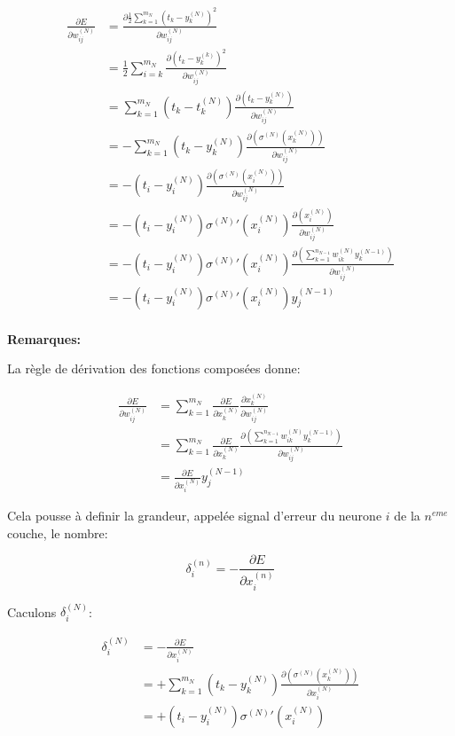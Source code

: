 \documentclass[11pt]{article}
\begin{document}
\begin{align}
\frac{\partial E}{\partial w_{ij}^{(N)}}
& = \frac{\partial \frac{1}{2}\sum_{k=1}^{m_{N}}
(t_{k}-y_{k}^{(N)})^{2}}{\partial w_{ij}^{(N)}}\\
& = \frac{1}{2}\sum_{i=k}^{m_{N}}
\frac{\partial (t_{k}-y_{k}^{(k)})^{2}}{\partial w_{ij}^{(N)}}\\
& = \sum_{k=1}^{m_{N}}(t_{k}-t_{k}^{(N)})
\frac{\partial (t_{k}-y_{k}^{(N)})}{\partial w_{ij}^{(N)}}\\
& = -\sum_{k=1}^{m_{N}}(t_{k}-y_{k}^{(N)})
\frac{\partial (\sigma^{(N)}(x_{k}^{(N)}))}{\partial w_{ij}^{(N)}}\\
& = -(t_{i}-y_{i}^{(N)})
\frac{\partial (\sigma^{(N)}(x_{i}^{(N)}))}{\partial w_{ij}^{(N)}}\\
& = -(t_{i}-y_{i}^{(N)})\sigma^{(N)}'(x_{i}^{(N)})
\frac{\partial (x_{i}^{(N)})}{\partial w_{ij}^{(N)}}\\
& = -(t_{i}-y_{i}^{(N)})\sigma^{(N)}'(x_{i}^{(N)})
\frac{\partial (\sum_{k=1}^{n_{N-1}}w_{ik}^{(N)}y_{k}^{(N-1)})}
{\partial w_{ij}^{(N)}}\\
& = -(t_{i}-y_{i}^{(N)})\sigma^{(N)}'(x_{i}^{(N)})y_{j}^{(N-1)}\\
\end{align}

\textbf{Remarques:}

La règle de dérivation des fonctions composées donne:

\begin{align}
\frac{\partial E}{\partial w_{ij}^{(N)}}
& = \sum_{k=1}^{m_{N}}\frac{\partial E}{\partial x_{k}^{(N)}}
\frac{\partial x_{k}^{(N)}}{\partial w_{ij}^{(N)}}\\
& = \sum_{k=1}^{m_{N}}\frac{\partial E}{\partial x_{k}^{(N)}}
\frac{\partial (\sum_{k=1}^{n_{N-1}}w_{ik}^{(N)}y_{k}^{(N-1)})}
{\partial w_{ij}^{(N)}}\\
& = \frac{\partial E}{\partial x_{i}^{(N)}}y_{j}^{(N-1)}
\end{align}

Cela pousse à definir la grandeur, appelée signal d'erreur du neurone $i$ de la
$n^{eme}$ couche, le nombre:

\begin{equation}
\delta_{i}^{(n)}=-\frac{\partial E}{\partial x_{i}^{(n)}}
\end{equation}

Caculons $\delta_{i}^{(N)}$:

\begin{align}
\delta_{i}^{(N)}
& = -\frac{\partial E}{\partial x_{i}^{(N)}}\\
& = +\sum_{k=1}^{m_{N}}(t_{k}-y_{k}^{(N)})
\frac{\partial (\sigma^{(N)}(x_{k}^{(N)}))}{\partial x_{i}^{(N)}}\\
& = +(t_{i}-y_{i}^{(N)})\sigma^{(N)}'(x_{i}^{(N)})
\end{align}
\end{document}
